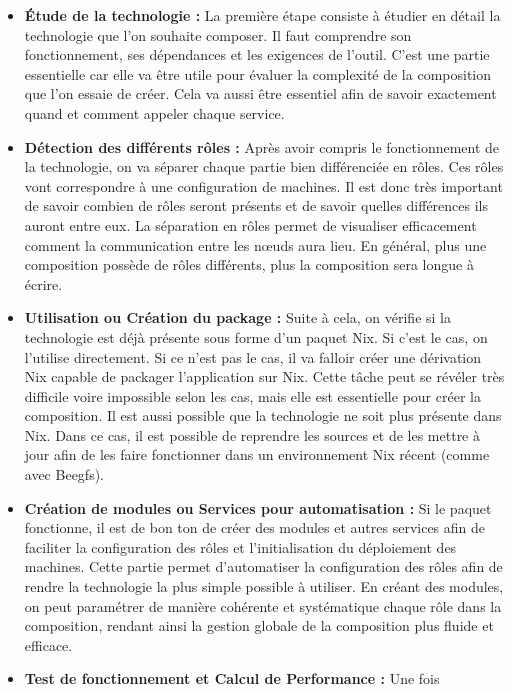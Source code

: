 \documentclass[a4paper,french,12pt, titlepage]{article}
\begin{document}
\begin{itemize}
\item
  \textbf{Étude de la technologie :} La première étape consiste à
  étudier en détail la technologie que l'on souhaite composer. Il faut
  comprendre son fonctionnement, ses dépendances et les exigences de
  l'outil. C'est une partie essentielle car elle va être utile pour
  évaluer la complexité de la composition que l'on essaie de créer. Cela
  va aussi être essentiel afin de savoir exactement quand et comment
  appeler chaque service.
\item
  \textbf{Détection des différents rôles :} Après avoir compris le
  fonctionnement de la technologie, on va séparer chaque partie bien
  différenciée en rôles. Ces rôles vont correspondre à une configuration
  de machines. Il est donc très important de savoir combien de rôles
  seront présents et de savoir quelles différences ils auront entre eux.
  La séparation en rôles permet de visualiser efficacement comment la
  communication entre les nœuds aura lieu. En général, plus une
  composition possède de rôles différents, plus la composition sera
  longue à écrire.
\item
  \textbf{Utilisation ou Création du package :} Suite à cela, on vérifie
  si la technologie est déjà présente sous forme d'un paquet Nix. Si
  c'est le cas, on l'utilise directement. Si ce n'est pas le cas, il va
  falloir créer une dérivation Nix capable de packager l'application sur
  Nix. Cette tâche peut se révéler très difficile voire impossible selon
  les cas, mais elle est essentielle pour créer la composition. Il est
  aussi possible que la technologie ne soit plus présente dans Nix. Dans
  ce cas, il est possible de reprendre les sources et de les mettre à
  jour afin de les faire fonctionner dans un environnement Nix récent
  (comme avec Beegfs).
\item
  \textbf{Création de modules ou Services pour automatisation :} Si le
  paquet fonctionne, il est de bon ton de créer des modules et autres
  services afin de faciliter la configuration des rôles et
  l'initialisation du déploiement des machines. Cette partie permet
  d'automatiser la configuration des rôles afin de rendre la technologie
  la plus simple possible à utiliser. En créant des modules, on peut
  paramétrer de manière cohérente et systématique chaque rôle dans la
  composition, rendant ainsi la gestion globale de la composition plus
  fluide et efficace.
\item
  \textbf{Test de fonctionnement et Calcul de Performance :} Une fois

\end{itemize}
\end{document}
